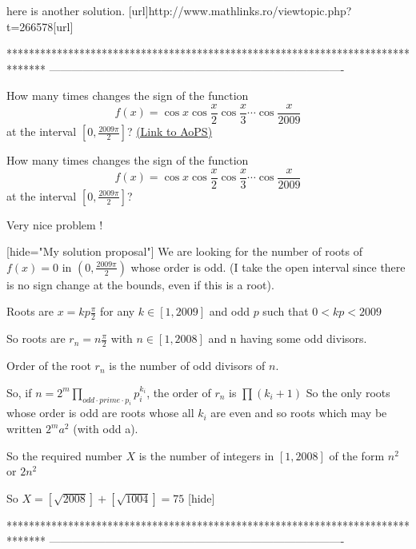 \begin{solution}
	here is another solution. [url]http://www.mathlinks.ro/viewtopic.php?t=266578[\/url]
\end{solution}
*******************************************************************************
-------------------------------------------------------------------------------

\begin{problem}
	How many times changes the sign of the function \[ f(x)=\cos x\cos\frac{x}{2}\cos\frac{x}{3}\cdots\cos\frac{x}{2009}\] at the interval $ \left[0, \frac{2009\pi}{2}\right]$?
	\flushright \href{https://artofproblemsolving.com/community/c6h276374}{(Link to AoPS)}
\end{problem}



\begin{solution}
	\begin{tcolorbox}How many times changes the sign of the function
\[ f(x) = \cos x\cos\frac {x}{2}\cos\frac {x}{3}\cdots\cos\frac {x}{2009}
\]
at the interval $ \left[0, \frac {2009\pi}{2}\right]$?\end{tcolorbox}

Very nice problem !

[hide="My solution proposal"]
We are looking for the number of roots of $ f(x) = 0$ in $ (0,\frac {2009\pi}{2})$ whose order is odd. (I take the open interval since there is no sign change at the bounds, even if this is a root).

Roots are $ x = kp\frac {\pi}{2}$ for any $ k\in[1,2009]$ and odd $ p$ such that $ 0 < kp < 2009$

So roots are $ r_n = n\frac {\pi}{2}$ with $ n\in[1,2008]$ and n having some odd divisors.

Order of the root $ r_n$ is the number of odd divisors of $ n$. 

So, if $ n = 2^m\prod_{odd\cdot prime\cdot p_i}p_i^{k_i}$, the order of $ r_n$ is $ \prod (k_i + 1)$
So the only roots whose order is odd are roots whose all $ k_i$ are even and so roots which may be written $ 2^ma^2$ (with odd a).

So the required number $ X$ is the number of integers in $ [1,2008]$ of the form $ n^2$ or $ 2n^2$

So $ X = [\sqrt {2008}] + [\sqrt {1004}] = 75$
[\/hide]
\end{solution}
*******************************************************************************
-------------------------------------------------------------------------------

